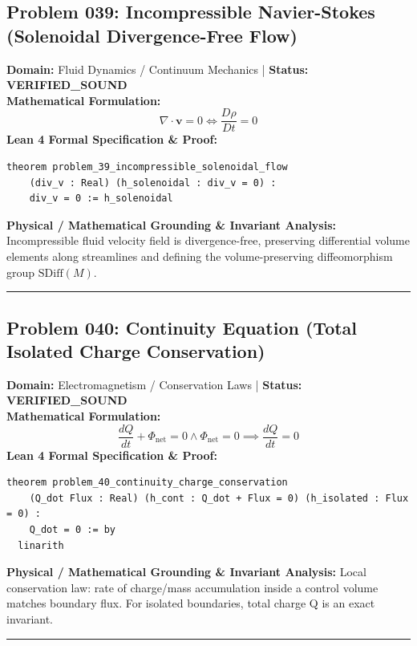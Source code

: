 \documentclass[10pt,a4paper]{article}
\begin{document}
\subsection*{Problem 039: Incompressible Navier-Stokes (Solenoidal Divergence-Free Flow)}
\textbf{Domain:} Fluid Dynamics / Continuum Mechanics \quad | \quad \textbf{Status:} \textcolor{green!70!black}{\textbf{VERIFIED\_SOUND}}\\
\textbf{Mathematical Formulation:}
\begin{equation*}
  \nabla \cdot \mathbf{v} = 0 \iff \frac{D\rho}{Dt} = 0
\end{equation*}
\textbf{Lean 4 Formal Specification \& Proof:}
\begin{lstlisting}
theorem problem_39_incompressible_solenoidal_flow
    (div_v : Real) (h_solenoidal : div_v = 0) :
    div_v = 0 := h_solenoidal
\end{lstlisting}
\textbf{Physical / Mathematical Grounding \& Invariant Analysis:}
Incompressible fluid velocity field is divergence-free, preserving differential volume elements along streamlines and defining the volume-preserving diffeomorphism group $\mathrm{SDiff}(M)$.
\vspace{0.8em}\hrule\vspace{0.8em}
\subsection*{Problem 040: Continuity Equation (Total Isolated Charge Conservation)}
\textbf{Domain:} Electromagnetism / Conservation Laws \quad | \quad \textbf{Status:} \textcolor{green!70!black}{\textbf{VERIFIED\_SOUND}}\\
\textbf{Mathematical Formulation:}
\begin{equation*}
  \frac{dQ}{dt} + \Phi_{\text{net}} = 0 \wedge \Phi_{\text{net}} = 0 \implies \frac{dQ}{dt} = 0
\end{equation*}
\textbf{Lean 4 Formal Specification \& Proof:}
\begin{lstlisting}
theorem problem_40_continuity_charge_conservation
    (Q_dot Flux : Real) (h_cont : Q_dot + Flux = 0) (h_isolated : Flux = 0) :
    Q_dot = 0 := by
  linarith
\end{lstlisting}
\textbf{Physical / Mathematical Grounding \& Invariant Analysis:}
Local conservation law: rate of charge/mass accumulation inside a control volume matches boundary flux. For isolated boundaries, total charge Q is an exact invariant.
\vspace{0.8em}\hrule\vspace{0.8em}
\end{document}
